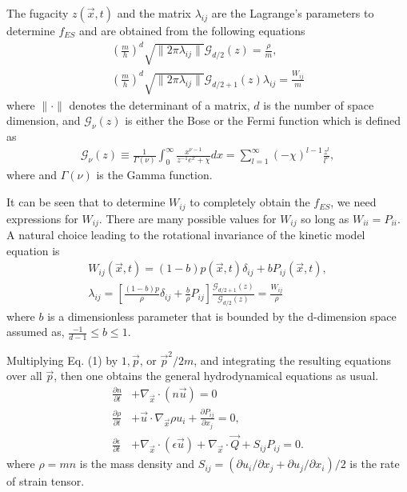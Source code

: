 \documentclass[doublecol]{epl2}
\begin{document}
The fugacity $z(\vec x,t)$ and the matrix $\lambda_{i j}$ are the Lagrange's parameters to determine $f_{ES}$ and are obtained from the following equations
\begin{align}
\left(\frac{m}{h}\right)^d \sqrt{ \|2 \pi \lambda_{i j}\| } \mathcal{G}_{d/2}(z) = \frac{\rho}{m}, \\
\left(\frac{m}{h}\right)^d \sqrt{ \|2 \pi \lambda_{i j}\| } \mathcal{G}_{d/2 +1}(z) \lambda_{i j} = \frac{W_{i j}}{m}
\end{align}
where $\| \cdot \|$ denotes the determinant of a matrix, $d$ is the number of space dimension, and $\mathcal{G}_{\nu}(z)$ is either the Bose or the Fermi function which is defined as
\begin{align}
\mathcal{G}_{\nu}(z) \equiv \frac{1}{\Gamma(\nu)} \int^{\infty}_0 \frac{ x^{\nu
-1} }{ {z^{-1} e^x + \chi}}dx = \sum^{\infty}_{l=1}
(-\chi)^{l-1} \frac{z^l}{l^{\nu}},
\end{align}
where and $\Gamma(\nu)$ is the Gamma function.

It can be seen that to determine $W_{i j} $ to completely obtain the $f_{ES}$, we need expressions for $W_{i j}$.   There are many possible values for $W_{i j}$ so long as $W_{i i}=P_{i i}$.   A natural choice leading to the rotational invariance of the kinetic model equation is \cite{Holway1966}
\begin{align}
W_{i j}(\vec x, t) = (1 - b) p(\vec x, t) \delta_{i j} + b P_{i j}(\vec x, t), \\
\lambda_{i j} = \left[\frac{(1-b)p}{\rho} \delta_{i j}+ \frac{b}{\rho}P_{i j } \right] \frac{\mathcal{G}_{d/2+1}(z)}{\mathcal{G}_{d/2}(z)} = \frac{W_{i j}}{\rho}
\end{align}
where $b$ is a dimensionless parameter that is bounded by the d-dimension space assumed as, $\frac{-1}{d-1} \le b \le 1$.

Multiplying Eq. (1) by $1, \vec p$, or $\vec p^2/2m$, and integrating the resulting equations over all $\vec p$, then one obtains the general hydrodynamical equations as usual.
\begin{align}
\frac{\partial n}{\partial t} &+ \nabla_{\vec x} \cdot (n \vec u) = 0 \\
\frac{\partial \rho}{\partial t} &+ \vec u \cdot \nabla_{\vec x} \rho u_{i} + \frac{\partial P_{ij}}{\partial x_{j} } = 0, \\
\frac{\partial \epsilon}{\partial t} &+ \nabla_{\vec x} \cdot (\epsilon \vec u) + \nabla_{\vec x} \cdot \vec Q + S_{ij} P_{ij} = 0.
\end{align}
where $\rho=m n$ is the mass density and $S_{ij}=(\partial u_{i}/\partial x_{j} + \partial u_{j}/\partial x_{i})/2$ is the rate of strain tensor.
\end{document}
